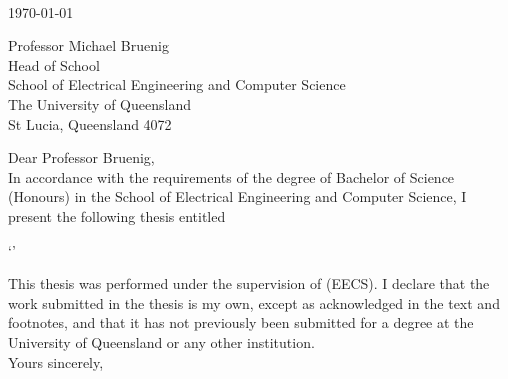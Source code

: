 \begin{flushright}
    \authortext\\
    \href{mailto:\authoremailtext}{\authoremailtext}
\end{flushright}

\vspace{2cm}
\noindent
\today \\\bigskip

\noindent
Professor Michael Bruenig\\
Head of School\\
School of Electrical Engineering and Computer Science\\
The University of Queensland\\
St Lucia, Queensland 4072\\\bigskip

\noindent
Dear Professor Bruenig,\\

In accordance with the requirements of the degree of Bachelor of Science (Honours) in the School of Electrical Engineering and Computer Science, I present the following thesis entitled

\begin{center}
`\titletext'
\end{center}

This thesis was performed under the supervision of \supervisornametext (EECS). I declare that the work submitted in the thesis is my own, except as acknowledged in the text and footnotes, and that it has not previously been submitted for a degree at the University of Queensland or any other institution.\\

\noindent
Yours sincerely,\\\\%

\noindent
\authortext

\clearpage